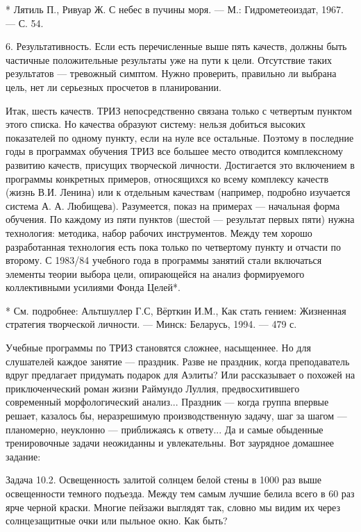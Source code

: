 * Лятиль П.,  Ривуар Ж. С небес в пучины  моря. — М.: Гидрометеоиздат,
1967. — С. 54.


6. Результативность. Если есть перечисленные выше пять качеств, должны
быть частичные положительные результаты уже на пути к цели. Отсутствие
таких результатов  — тревожный симптом. Нужно  проверить, правильно ли
выбрана цель, нет ли серьезных просчетов в планировании.

Итак, шесть  качеств. ТРИЗ непосредственно связана  только с четвертым
пунктом этого  списка. Но  качества образуют систему:  нельзя добиться
высоких  показателей по  одному пункту,  если на  нуле все  остальные.
Поэтому  в  последние годы  в  программах  обучения ТРИЗ  все  большее
место  отводится комплексному  развитию  качеств, присущих  творческой
личности. Достигается это включением  в программы конкретных примеров,
относящихся  ко всему  комплексу  качеств (жизнь  В.И.  Ленина) или  к
отдельным  качествам  (например,  подробно  изучается  система  А.  А.
Любищева). Разумеется,  показ на примерах —  начальная форма обучения.
По  каждому из  пяти пунктов  (шестой —  результат первых  пяти) нужна
технология:  методика, набор  рабочих инструментов.  Между тем  хорошо
разработанная  технология  есть пока  только  по  четвертому пункту  и
отчасти  по  второму. С  1983/84  учебного  года в  программы  занятий
стали включаться  элементы теории  выбора цели, опирающейся  на анализ
формируемого коллективными усилиями Фонда Целей*.

*  См. подробнее:  Альтшуллер  Г.С, Вёрткин  И.М.,  Как стать  гением:
Жизненная стратегия  творческой личности.  — Минск: Беларусь,  1994. —
479 с.


Учебные  программы  по ТРИЗ  становятся  сложнее,  насыщеннее. Но  для
слушателей  каждое  занятие  —  праздник.  Разве  не  праздник,  когда
преподаватель  вдруг  предлагает  придумать подарок  для  Аэлиты?  Или
рассказывает  о  похожей  на   приключенческий  роман  жизни  Раймундо
Луллия,   предвосхитившего   современный   морфологический   анализ...
Праздник  — когда  группа  впервые решает,  казалось бы,  неразрешимую
производственную  задачу,  шаг  за  шагом —  планомерно,  неуклонно  —
приближаясь  к ответу...  Да  и самые  обыденные тренировочные  задачи
неожиданны и увлекательны. Вот заурядное домашнее задание:

Задача 10.2. Освещенность залитой солнцем  белой стены в 1000 раз выше
освещенности темного подъезда.  Между тем самым лучшие  белила всего в
60  раз ярче  черной краски.  Многие пейзажи  выглядят так,  словно мы
видим их через солнцезащитные очки или пыльное окно. Как быть?

